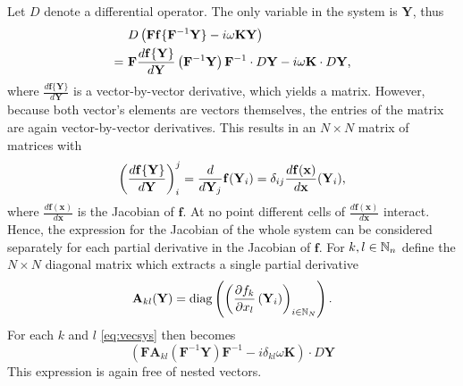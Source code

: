 Let $D$ denote a differential operator.
The only variable in the system is $\mathbf Y$, thus
	\begin{align}
		& D \left( \mathbf{F} \mathbf{f}\{\mathbf{F}^{-1} \mathbf{Y}\} - i \omega \mathbf K \mathbf Y \right) \nonumber \\
		=\ & \mathbf{F} \frac{d \mathbf{f}\{\mathbf Y\}}{d\mathbf Y} \left( \mathbf{F}^{-1} \mathbf{Y} \right) \mathbf{F}^{-1} \cdot D \mathbf Y - i \omega \mathbf K \cdot D \mathbf Y \label{eq:vecsys} \text,
	\end{align}
where $\frac{d \mathbf{f} \{ \mathbf Y \}}{d \mathbf Y}$ is a vector-by-vector derivative, which yields a matrix.
However, because both vector's elements are vectors themselves, the entries of the matrix are again vector-by-vector derivatives.
This results in an $N \times N$ matrix of matrices with
	\[
			\left( \frac{d \mathbf{f}\{\mathbf Y\}}{d\mathbf Y} \right)_i^j = \frac{d}{d\mathbf Y_j} \mathbf f (\mathbf Y_i) = \delta_{ij} \frac{d \mathbf f(\mathbf x)}{d \mathbf x}(\mathbf Y_i) \text, %
	\]
where $\frac{d \mathbf f(\mathbf x)}{d\mathbf x}$ is the Jacobian of $\mathbf f$.
At no point different cells of $\frac{d \mathbf f(\mathbf x)}{d\mathbf x}$ interact.
Hence, the expression for the Jacobian of the whole system can be considered separately for each partial derivative in the Jacobian of $\mathbf f$.
For $k,l \in \mathbb{N}_n$ define the $N \times N$ diagonal matrix which extracts a single partial derivative
	\[
		\mathbf A_{kl}(\mathbf Y) = \operatorname{diag}\left( \left(\frac{\partial f_k}{\partial x_l} \left(\mathbf Y_i\right)\right)_{i \in \mathbb{N}_N} \right) \text.
	\]
For each $k$ and $l$ \autoref{eq:vecsys} then becomes
	\begin{equation}
		\left( \mathbf{F} \mathbf A_{kl}(\mathbf{F}^{-1} \mathbf{Y}) \mathbf{F}^{-1} - i \delta_{kl} \omega \mathbf K \right) \cdot D \mathbf Y
	\label{eq:syssingle}
	\end{equation}
This expression is again free of nested vectors.

